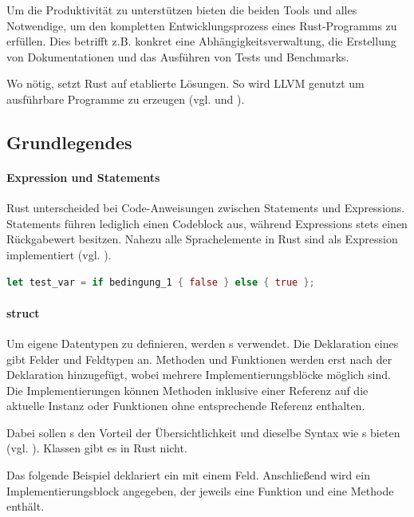 \documentclass[11pt,a4paper, ngerman]{article}
\begin{document}
Um die Produktivität zu unterstützen bieten die beiden Tools  und  alles Notwendige, um den kompletten Entwicklungsprozess eines Rust-Programms zu erfüllen. Dies betrifft z.B. konkret eine Abhängigkeitsverwaltung, die Erstellung von Dokumentationen und das Ausführen von Tests und Benchmarks.

Wo nötig, setzt Rust auf etablierte Lösungen. So wird LLVM genutzt um ausführbare Programme zu erzeugen (vgl. \cite{RustcCodegen2} und \cite{RustcCodegen}).

\subsection{Grundlegendes}
\paragraph{Expression und Statements} Rust unterscheided bei Code-Anweisungen zwischen Statements und Expressions. Statements führen lediglich einen Codeblock aus, während Expressions stets einen Rückgabewert besitzen. Nahezu alle Sprachelemente in Rust sind als Expression implementiert (vgl. \cite[S. 122 ff.]{BO18}).

\begin{lstlisting}[language=rust, caption={Expression Einführendes Beispiel:}]
    let test_var = if bedingung_1 { false } else { true };
\end{lstlisting}

\paragraph{struct} Um eigene Datentypen zu definieren, werden s verwendet. Die Deklaration eines  gibt Felder und Feldtypen an. Methoden und Funktionen werden erst nach der Deklaration hinzugefügt, wobei mehrere Implementierungsblöcke möglich sind. Die Implementierungen können Methoden inklusive einer Referenz auf die aktuelle Instanz oder Funktionen ohne entsprechende Referenz enthalten.

Dabei sollen s den Vorteil der Übersichtlichkeit und dieselbe Syntax wie s bieten (vgl. \cite[S. 91]{BO18}). Klassen gibt es in Rust nicht.

Das folgende Beispiel deklariert ein  mit einem Feld. Anschließend wird ein Implementierungsblock angegeben, der jeweils eine Funktion und eine Methode enthält.
\end{document}
